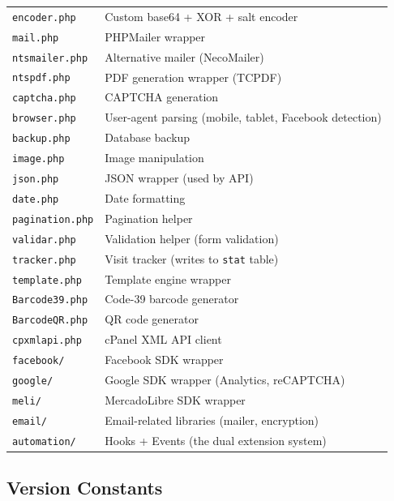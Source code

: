 \documentclass[11pt,a4paper]{article}
\begin{document}
\begin{table}[htbp]
\begin{tabularx}{\columnwidth}{lX}
\texttt{encoder.php}      & Custom base64 + XOR + salt encoder \\
\texttt{mail.php}         & PHPMailer wrapper \\
\texttt{ntsmailer.php}    & Alternative mailer (NecoMailer) \\
\texttt{ntspdf.php}       & PDF generation wrapper (TCPDF) \\
\texttt{captcha.php}      & CAPTCHA generation \\
\texttt{browser.php}      & User-agent parsing (mobile, tablet, Facebook detection) \\
\texttt{backup.php}       & Database backup \\
\texttt{image.php}        & Image manipulation \\
\texttt{json.php}         & JSON wrapper (used by API) \\
\texttt{date.php}         & Date formatting \\
\texttt{pagination.php}   & Pagination helper \\
\texttt{validar.php}      & Validation helper (form validation) \\
\texttt{tracker.php}      & Visit tracker (writes to \texttt{stat} table) \\
\texttt{template.php}     & Template engine wrapper \\
\texttt{Barcode39.php}    & Code-39 barcode generator \\
\texttt{BarcodeQR.php}    & QR code generator \\
\texttt{cpxmlapi.php}     & cPanel XML API client \\
\texttt{facebook/}        & Facebook SDK wrapper \\
\texttt{google/}          & Google SDK wrapper (Analytics, reCAPTCHA) \\
\texttt{meli/}            & MercadoLibre SDK wrapper \\
\texttt{email/}           & Email-related libraries (mailer, encryption) \\
\texttt{automation/}      & Hooks + Events (the dual extension system) \\
\bottomrule
\end{tabularx}
\end{table}

\subsection{Version Constants}
\end{document}

